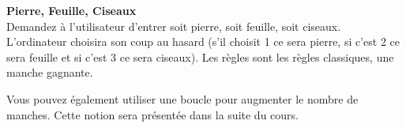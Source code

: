 \begin{Exercice}[20 minutes] \textbf{Pierre, Feuille, Ciseaux }\\
  Demandez à l'utilisateur d'entrer soit pierre, soit feuille, soit ciseaux. L'ordinateur choisira son coup au hasard (s'il choisit 1 ce sera pierre, si c'est 2 ce sera feuille et si c'est 3 ce sera ciseaux). Les règles sont les règles classiques, une manche gagnante.   \\
  
  
   
    \begin{solution}
    
    
    \end{solution}
    \begin{solution}
    
    Vous pouvez également utiliser une boucle pour augmenter le nombre de manches. Cette notion sera présentée dans la suite du cours.\\
           
    \end{solution}   
\end{Exercice}



